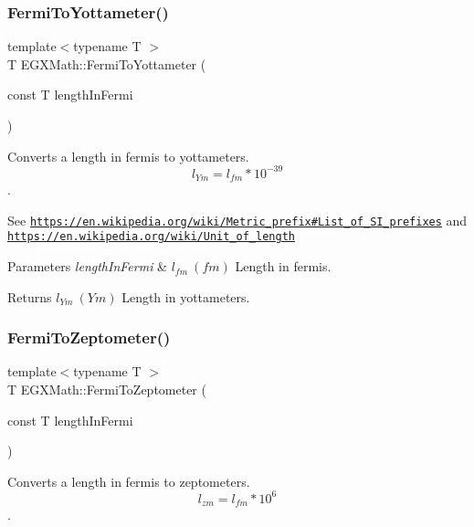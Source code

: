 \subsubsection{\texorpdfstring{Fermi\+To\+Yottameter()}{FermiToYottameter()}}
{\footnotesize\ttfamily template$<$typename T $>$ \\
T E\+G\+X\+Math\+::\+Fermi\+To\+Yottameter (\begin{DoxyParamCaption}\item[{const T}]{length\+In\+Fermi }\end{DoxyParamCaption})}



Converts a length in fermis to yottameters. \[ l_{Ym}=l_{fm} * 10^{-39} \]. 

See \href{https://en.wikipedia.org/wiki/Metric_prefix#List_of_SI_prefixes}{\tt https\+://en.\+wikipedia.\+org/wiki/\+Metric\+\_\+prefix\#\+List\+\_\+of\+\_\+\+S\+I\+\_\+prefixes} and \href{https://en.wikipedia.org/wiki/Unit_of_length}{\tt https\+://en.\+wikipedia.\+org/wiki/\+Unit\+\_\+of\+\_\+length} 
\begin{DoxyParams}{Parameters}
{\em length\+In\+Fermi} & $ l_{fm}\ (fm)$ Length in fermis. \\
\hline
\end{DoxyParams}
\begin{DoxyReturn}{Returns}
$ l_{Ym}\ (Ym)$ Length in yottameters. 
\end{DoxyReturn}
\mbox{\label{group___e_g_x_math-_conversions-_length_conversions-_non-_s_i-_fermi-_s_i_ga0f95ec9ae0444053a1d45ca652970f49}} 
\subsubsection{\texorpdfstring{Fermi\+To\+Zeptometer()}{FermiToZeptometer()}}
{\footnotesize\ttfamily template$<$typename T $>$ \\
T E\+G\+X\+Math\+::\+Fermi\+To\+Zeptometer (\begin{DoxyParamCaption}\item[{const T}]{length\+In\+Fermi }\end{DoxyParamCaption})}



Converts a length in fermis to zeptometers. \[ l_{zm}=l_{fm} * 10^{6} \]. 

